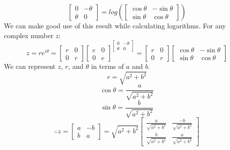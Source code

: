 \documentclass[12pt]{article}
\begin{document}
    $$ \begin{bmatrix}
        0 & -\theta \\
        \theta & 0 
    \end{bmatrix} = log(\begin{bmatrix}
        \cos{\theta} & {-\sin{\theta}} \\
        \sin{\theta} & \cos{\theta} 
    \end{bmatrix})
    $$
    We can make good use of this result while calculating logarithms. For any complex number $z$:
    $$ z = re^{i\theta} = \begin{bmatrix}
        r & 0 \\
        0 & r 
    \end{bmatrix} {\begin{bmatrix}
        e & 0 \\
        0 & e 
    \end{bmatrix}} ^ {\begin{bmatrix}
        0 & -\theta \\
        \theta & 0
    \end{bmatrix}} = \begin{bmatrix}
        r & 0 \\
        0 & r
    \end{bmatrix} \begin{bmatrix}
        \cos{\theta} & {-\sin{\theta}} \\
        \sin{\theta} & \cos{\theta} 
    \end{bmatrix}$$
    We can represent $z$, $r$, and $\theta$ in terms of $a$ and $b$.
    $$ r = \sqrt{a^2 + b^2} $$
    $$ \cos{\theta} = \frac{a}{\sqrt{a^2 + b^2}} $$
    $$ \sin{\theta} = \frac{b}{\sqrt{a^2 + b^2}} $$
    $$ \therefore
    z = \begin{bmatrix}
        a & -b \\
        b & a 
    \end{bmatrix} = \sqrt{a^2 + b^2} \begin{bmatrix}
        \frac{a}{\sqrt{a^2 + b^2}} & \frac{-b}{\sqrt{a^2 + b^2}} \\
        \frac{b}{\sqrt{a^2 + b^2}} & \frac{a}{\sqrt{a^2 + b^2}}
    \end{bmatrix} 
    $$
\end{document}
